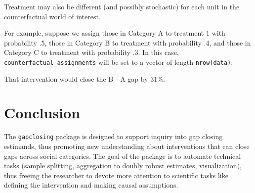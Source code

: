 \documentclass[
]{article}
\newenvironment{Shaded}{\begin{snugshade}}{\end{snugshade}}
\newcommand{\AttributeTok}[1]{\textcolor[rgb]{0.77,0.63,0.00}{#1}}
\newcommand{\DecValTok}[1]{\textcolor[rgb]{0.00,0.00,0.81}{#1}}
\newcommand{\FunctionTok}[1]{\textcolor[rgb]{0.00,0.00,0.00}{#1}}
\newcommand{\NormalTok}[1]{#1}
\newcommand{\OtherTok}[1]{\textcolor[rgb]{0.56,0.35,0.01}{#1}}
\newcommand{\SpecialCharTok}[1]{\textcolor[rgb]{0.00,0.00,0.00}{#1}}
\newcommand{\StringTok}[1]{\textcolor[rgb]{0.31,0.60,0.02}{#1}}
\begin{document}
Treatment may also be different (and possibly stochastic) for each unit in the counterfactual world of interest.

For example, suppose we assign those in Category A to treatment 1 with probability .5, those in Category B to treatment with probability .4, and those in Category C to treatment with probability .3. In this case, \texttt{counterfactual\_assignments} will be set to a vector of length \texttt{nrow(data)}.

\begin{Shaded}
\end{Shaded}

That intervention would close the B - A gap by 31\%.

\hypertarget{conclusion}{%
\section{Conclusion}\label{conclusion}}

The \texttt{gapclosing} package is designed to support inquiry into gap closing estimands, thus promoting new understanding about interventions that can close gaps across social categories. The goal of the package is to automate technical tasks (sample splitting, aggregation to doubly robust estimates, visualization), thus freeing the researcher to devote more attention to scientific tasks like defining the intervention and making causal assumptions.
\end{document}
